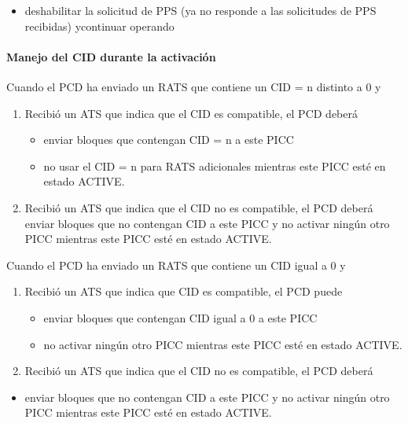 \begin{itemize}
	\item deshabilitar la solicitud de PPS (ya no responde a las solicitudes de PPS recibidas) ycontinuar operando
\end{itemize}\par

\paragraph{Manejo del CID durante la activación}
Cuando el PCD ha enviado un RATS que contiene un CID = n distinto a 0 y\par

\begin{enumerate}
	\item Recibió un ATS que indica que el CID es compatible, el PCD deberá\par

\begin{itemize}
	\item enviar bloques que contengan CID = n a este PICC\par

	\item no usar el CID = n para RATS adicionales mientras este PICC esté en estado ACTIVE.
\end{itemize}\par

	\item Recibió un ATS que indica que el CID no es compatible, el PCD deberá enviar bloques que no contengan CID a este PICC y no activar ningún otro PICC mientras este PICC esté en estado ACTIVE.
\end{enumerate}\par

Cuando el PCD ha enviado un RATS que contiene un CID igual a 0 y\par

\begin{enumerate}
	\item Recibió un ATS que indica que CID es compatible, el PCD puede\par

\begin{itemize}
	\item enviar bloques que contengan CID igual a 0 a este PICC\par

	\item no activar ningún otro PICC mientras este PICC esté en estado ACTIVE.
\end{itemize}\par

	\item Recibió un ATS que indica que el CID no es compatible, el PCD deberá
\end{enumerate}\par

\begin{itemize}
	\item enviar bloques que no contengan CID a este PICC y no activar ningún otro PICC mientras este PICC esté en estado ACTIVE.
\end{itemize}\par